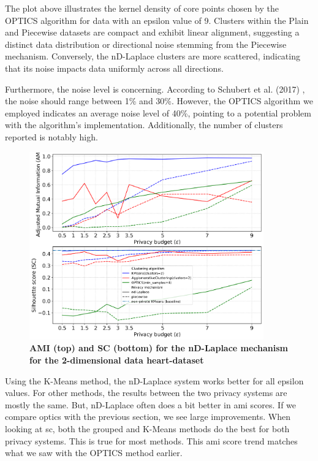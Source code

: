 The plot above illustrates the kernel density of core points chosen by the OPTICS algorithm for data with an epsilon value of 9. Clusters within the Plain and Piecewise datasets are compact and exhibit linear alignment, suggesting a distinct data distribution or directional noise stemming from the Piecewise mechanism. Conversely, the nD-Laplace clusters are more scattered, indicating that its noise impacts data uniformly across all directions.

Furthermore, the noise level is concerning. According to Schubert et al. (2017) \citep{schubert_dbscan_2017}, the noise should range between 1\% and 30\%. However, the OPTICS algorithm we employed indicates an average noise level of 40\%, pointing to a potential problem with the algorithm's implementation. Additionally, the number of clusters reported is notably high.


\newpage
\begin{figure}[H]
  \centering
  \caption{\textbf{AMI (top) and SC (bottom) for the nD-Laplace mechanism for the 2-dimensional data heart-dataset}}
  \includegraphics[width=0.9\textwidth]{Results/nd-laplace/nd-Laplace/heart-dataset/ami-and-sc_2_dimensions.png}

  \label{fig:validation-heart-dataset_comparison_2d-laplace}
\end{figure}
Using the K-Means method, the nD-Laplace system works better for all epsilon values. For other methods, the results between the two privacy systems are mostly the same. But, nD-Laplace often does a bit better in \gls{ami} scores. If we compare \gls{optics} with the previous section, we see large improvements.
When looking at \gls{sc}, both the grouped and K-Means methods do the best for both privacy systems. This is true for most methods. This \gls{ami} score trend matches what we saw with the OPTICS method earlier.

